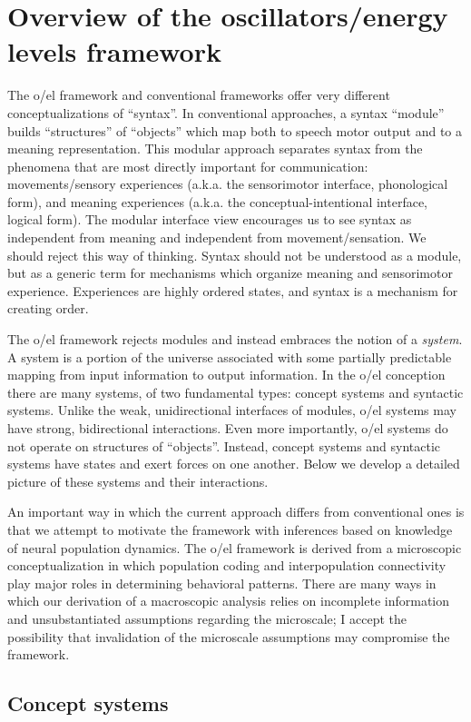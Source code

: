 \chapter{Overview of the oscillators/energy levels framework}
The o/el framework and conventional frameworks offer very different conceptualizations of “syntax”. In conventional approaches, a syntax “module” builds “structures” of “objects” which map both to speech motor output and to a meaning representation. This modular approach separates syntax from the phenomena that are most directly important for communication: movements/sensory experiences (a.k.a. the sensorimotor interface, phonological form), and meaning experiences (a.k.a. the conceptual-intentional interface, logical form). The modular interface view encourages us to see syntax as independent from meaning and independent from movement/sensation. We should reject this way of thinking. Syntax should not be understood as a module, but as a generic term for mechanisms which organize meaning and sensorimotor experience. Experiences are highly ordered states, and syntax is a mechanism for creating order. 

  The o/el framework rejects modules and instead embraces the notion of a \textit{system}. A system is a portion of the universe associated with some partially predictable mapping from input information to output information. In the o/el conception there are many systems, of two fundamental types: concept systems and syntactic systems. Unlike the weak, unidirectional interfaces of modules, o/el systems may have strong, bidirectional interactions. Even more importantly, o/el systems do not operate on structures of “objects”. Instead, concept systems and syntactic systems have states and exert forces on one another. Below we develop a detailed picture of these systems and their interactions. 

  An important way in which the current approach differs from conventional ones is that we attempt to motivate the framework with inferences based on knowledge of neural population dynamics. The o/el framework is derived from a microscopic conceptualization in which population coding and interpopulation connectivity play major roles in determining behavioral patterns. There are many ways in which our derivation of a macroscopic analysis relies on incomplete information and unsubstantiated assumptions regarding the microscale; I accept the possibility that invalidation of the microscale assumptions may compromise the framework.

\section{Concept systems}

